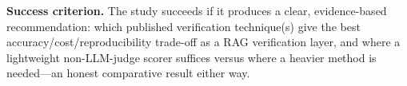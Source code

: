 \textbf{Success criterion.} The study succeeds if it produces a clear, evidence-based
recommendation: which published verification technique(s) give the best
accuracy/cost/reproducibility trade-off as a RAG verification layer, and where a
lightweight non-LLM-judge scorer suffices versus where a heavier method is needed---an
honest comparative result either way.
